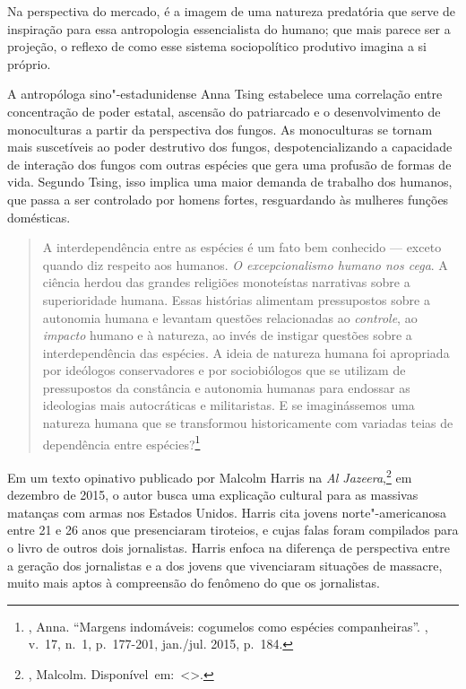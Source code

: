 Na perspectiva do mercado, é a imagem de uma natureza
predatória que serve de inspiração para essa antropologia essencialista
do humano; que mais parece ser a projeção, o reflexo de como esse
sistema sociopolítico produtivo imagina a si próprio.

A antropóloga sino"-estadunidense Anna Tsing estabelece uma correlação entre
concentração de poder estatal, ascensão do patriarcado e o
desenvolvimento de monoculturas a partir da perspectiva dos fungos. As
monoculturas se tornam mais suscetíveis ao poder destrutivo dos fungos,
despotencializando a capacidade de interação dos fungos com outras
espécies que gera uma profusão de formas de vida. Segundo Tsing, isso
implica uma maior demanda de trabalho dos humanos, que passa a ser
controlado por homens fortes, resguardando às mulheres funções
domésticas.

\begin{quote}
A interdependência entre as espécies é um fato bem conhecido --- exceto
quando diz respeito aos humanos. \emph{O excepcionalismo humano nos
cega}. A ciência herdou das grandes religiões monoteístas narrativas
sobre a superioridade humana. Essas histórias alimentam pressupostos
sobre a autonomia humana e levantam questões relacionadas ao
\emph{controle}, ao \emph{impacto} humano e à natureza, ao invés de
instigar questões sobre a interdependência das espécies. A ideia de
natureza humana foi apropriada por ideólogos conservadores e por
sociobiólogos que se utilizam de pressupostos da constância e autonomia
humanas para endossar as ideologias mais autocráticas e militaristas. E
se imaginássemos uma natureza humana que se transformou historicamente
com variadas teias de dependência entre espécies?\footnote{,
  Anna. ``Margens indomáveis: cogumelos como espécies companheiras''. {}, v.~17, n.~1, p.~177-201, jan./jul. 2015, p.~184.}
\end{quote}

\asterisc

Em um texto opinativo publicado por Malcolm Harris na \emph{Al Jazeera},\footnote{, Malcolm. \mbox{Disponível em: \textless{}{}\textgreater{}.}}
em dezembro de 2015, o autor busca uma explicação cultural para as
massivas matanças com armas nos Estados Unidos. Harris cita jovens norte"-americanosa entre 21 e 26 anos que presenciaram tiroteios, e cujas
falas foram compilados para o livro de outros dois jornalistas. Harris
enfoca na diferença de perspectiva entre a geração dos jornalistas e a
dos jovens que vivenciaram situações de massacre, muito mais aptos à
compreensão do fenômeno do que os jornalistas.

